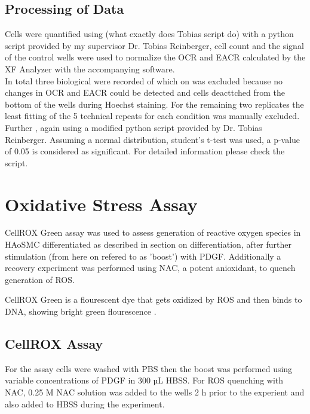     \subsection{Processing of Data}
    Cells were quantified using (what exactly does Tobias script do) with a python script provided by my supervisor Dr. Tobias Reinberger, cell count and the signal of the control wells were used to normalize the OCR and EACR calculated by the XF Analyzer with the accompanying software.\\
    In total three biological were recorded of which on was excluded because no changes in OCR and EACR could be detected and cells deacttched from the bottom of the wells during Hoechst staining. For the remaining two replicates the least fitting of the 5 technical repeats for each condition was manually excluded.\\
    Further , again using a modified python script provided by Dr. Tobias Reinberger. Assuming a normal distribution, student's t-test was used, a p-value of 0.05 is considered as significant. For detailed information please check the script.

\section{Oxidative Stress Assay}
\label{sec:cellrox}
CellROX Green assay was used to assess generation of reactive oxygen species in HAoSMC differentiated as described in section on differentiation, after further stimulation (from here on refered to as 'boost') with PDGF. Additionally a recovery experiment was performed using NAC, a potent anioxidant, to quench generation of ROS.

\noindent CellROX Green is a flourescent dye that gets oxidized by ROS and then binds to DNA, showing bright green flourescence \cite{CellROXGreenReagent}.

    \subsection{CellROX Assay}
    For the assay cells were washed with PBS then the boost was performed using variable concentrations of PDGF in 300 µL HBSS. For ROS quenching with NAC, 0.25 M NAC solution was added to the wells 2 h prior to the experient and also added to HBSS during the experiment.


